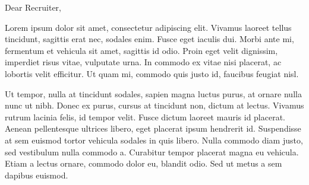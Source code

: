 \documentclass[letterpaper]{liam-cover} %
\begin{document}




\twitter{}


\sectionspace

\begin{minipage}[t]{0.5\textwidth} 
\end{minipage}
\begin{minipage}[t]{0.49\textwidth} 
\descript{\raggedleft\today}
\end{minipage}

\sectionspace
\sectionspace

\RaggedRight

Dear Recruiter,

Lorem ipsum dolor sit amet, consectetur adipiscing elit. Vivamus laoreet tellus tincidunt, sagittis erat nec, sodales enim. Fusce eget iaculis dui. Morbi ante mi, fermentum et vehicula sit amet, sagittis id odio. Proin eget velit dignissim, imperdiet risus vitae, vulputate urna. In commodo ex vitae nisi placerat, ac lobortis velit efficitur. Ut quam mi, commodo quis justo id, faucibus feugiat nisl.

Ut tempor, nulla at tincidunt sodales, sapien magna luctus purus, at ornare nulla nunc ut nibh. Donec ex purus, cursus at tincidunt non, dictum at lectus. Vivamus rutrum lacinia felis, id tempor velit. Fusce dictum laoreet mauris id placerat. Aenean pellentesque ultrices libero, eget placerat ipsum hendrerit id. Suspendisse at sem euismod tortor vehicula sodales in quis libero. Nulla commodo diam justo, sed vestibulum nulla commodo a. Curabitur tempor placerat magna eu vehicula. Etiam a lectus ornare, commodo dolor eu, blandit odio. Sed ut metus a sem dapibus euismod.
\end{document}

